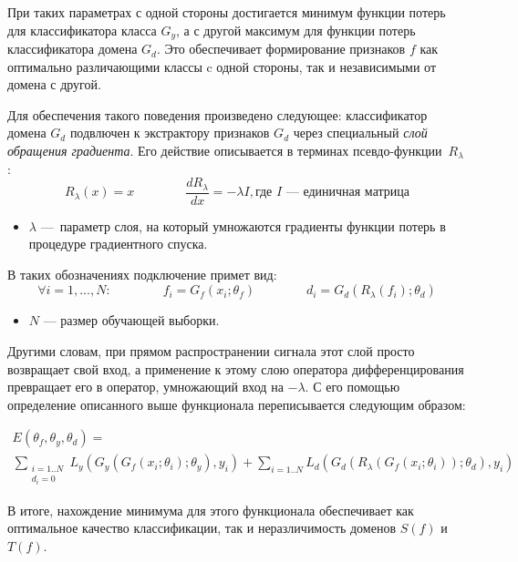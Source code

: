 \documentclass[14pt, a4paper]{extarticle}
\begin{document}
При таких параметрах с одной стороны достигается минимум функции потерь для классификатора класса $G_y$, а с другой максимум для функции потерь классификатора домена $G_d$. Это обеспечивает формирование признаков $f$ как оптимально различающими классы c одной стороны, так и независимыми от домена с другой.

Для обеспечения такого поведения произведено следующее: классификатор домена $G_d$ подвлючен к экстрактору признаков $G_d$ через специальный \textit{слой обращения градиента}. Его действие описывается в терминах псевдо-функции~$R_{\lambda}$:
\begin{equation*}
	R_{\lambda}(x) = x \quad \quad \quad \quad
	\frac{dR_{\lambda}}{dx} = -\lambda I, \text{где $I$ — единичная матрица}
\end{equation*}
\begin{itemize}
	\item $\lambda$ — параметр слоя, на который умножаются градиенты функции потерь в процедуре градиентного спуска.
\end{itemize}
В таких обозначениях подключение примет вид:
\begin{equation*}
\forall i = 1, ..., N: \quad \quad \quad \quad
f_i = G_f(x_i; \theta_f) \quad \quad \quad \quad
d_i = G_d(R_{\lambda}(f_i); \theta_d)	
\end{equation*}
\begin{itemize}
	\item $N$ — размер обучающей выборки.
\end{itemize}

Другими словам, при прямом распространении сигнала этот слой просто возвращает свой вход, а применение к этому слою оператора дифференцирования превращает его в оператор, умножающий вход на $-\lambda$. С его помощью определение описанного выше функционала переписывается следующим образом:

\begin{equation*}\label{E}
\begin{gathered}
E(\theta_f, \theta_y, \theta_d) = \\ \sum_{ \substack{i=1..N \\ d_i=0} }L_y(G_y(G_f(x_i; \theta_i); \theta_y), y_i) + \sum_{ i=1..N } L_d(G_d(R_{\lambda}(G_f(x_i; \theta_i)); \theta_d), y_i)
\end{gathered}
\end{equation*}

В итоге, нахождение минимума для этого функционала обеспечивает как оптимальное качество классификации, так и неразличимость доменов $S(f)$ и $T(f)$.
\end{document}
